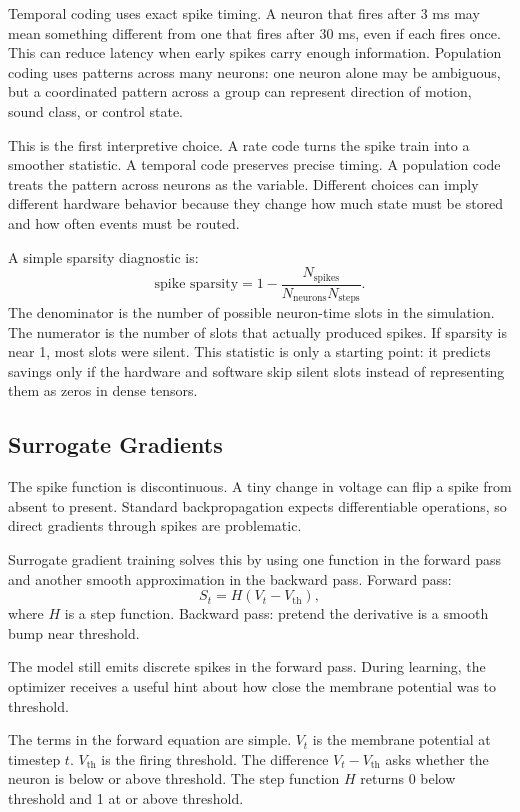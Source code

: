 Temporal coding uses exact spike timing. A neuron that fires after 3 ms may mean something different from one that fires after 30 ms, even if each fires once. This can reduce latency when early spikes carry enough information. Population coding uses patterns across many neurons: one neuron alone may be ambiguous, but a coordinated pattern across a group can represent direction of motion, sound class, or control state.

This is the first interpretive choice. A rate code turns the spike train into a smoother statistic. A temporal code preserves precise timing. A population code treats the pattern across neurons as the variable. Different choices can imply different hardware behavior because they change how much state must be stored and how often events must be routed.

A simple sparsity diagnostic is:
\[
  \text{spike sparsity}
  =
  1 - \frac{N_{\text{spikes}}}{N_{\text{neurons}}N_{\text{steps}}}.
\]
The denominator is the number of possible neuron-time slots in the simulation. The numerator is the number of slots that actually produced spikes. If sparsity is near 1, most slots were silent. This statistic is only a starting point: it predicts savings only if the hardware and software skip silent slots instead of representing them as zeros in dense tensors.

\subsection{Surrogate Gradients}

The spike function is discontinuous. A tiny change in voltage can flip a spike from absent to present. Standard backpropagation expects differentiable operations, so direct gradients through spikes are problematic.

Surrogate gradient training solves this by using one function in the forward pass and another smooth approximation in the backward pass. Forward pass:
\[
  S_t = H(V_t - V_{\text{th}}),
\]
where \(H\) is a step function. Backward pass: pretend the derivative is a smooth bump near threshold.

\begin{aside}
The model still emits discrete spikes in the forward pass. During learning, the optimizer receives a useful hint about how close the membrane potential was to threshold.
\end{aside}

The terms in the forward equation are simple. \(V_t\) is the membrane potential at timestep \(t\). \(V_{\text{th}}\) is the firing threshold. The difference \(V_t - V_{\text{th}}\) asks whether the neuron is below or above threshold. The step function \(H\) returns 0 below threshold and 1 at or above threshold.

